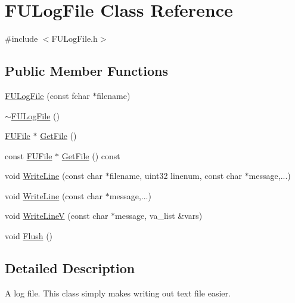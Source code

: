 \hypertarget{classFULogFile}{
\section{FULogFile Class Reference}
\label{classFULogFile}
}


{\ttfamily \#include $<$FULogFile.h$>$}

\subsection*{Public Member Functions}
\begin{DoxyCompactItemize}
\item 
\hyperlink{classFULogFile_a24f47360790fe181cf9a6f5eecbfa665}{FULogFile} (const fchar $\ast$filename)
\item 
\hyperlink{classFULogFile_a5605db6ad24442abf1c11eabc2441d18}{$\sim$FULogFile} ()
\item 
\hyperlink{classFUFile}{FUFile} $\ast$ \hyperlink{classFULogFile_ab467075d0b5de7a0567df1c2dce5fcc6}{GetFile} ()
\item 
const \hyperlink{classFUFile}{FUFile} $\ast$ \hyperlink{classFULogFile_a131da7bcdaa6500b0e781d13d8870ac9}{GetFile} () const 
\item 
void \hyperlink{classFULogFile_afa88920acb58dc26475f046888ce7849}{WriteLine} (const char $\ast$filename, uint32 linenum, const char $\ast$message,...)
\item 
void \hyperlink{classFULogFile_a6c9e8756296da59251deab601b2c9673}{WriteLine} (const char $\ast$message,...)
\item 
void \hyperlink{classFULogFile_aee6dc11141cbb351108dadd4cbec26bd}{WriteLineV} (const char $\ast$message, va\_\-list \&vars)
\item 
void \hyperlink{classFULogFile_a92737f1f18917d957f65bab9f8336ed8}{Flush} ()
\end{DoxyCompactItemize}


\subsection{Detailed Description}
A log file. This class simply makes writing out text file easier. 

